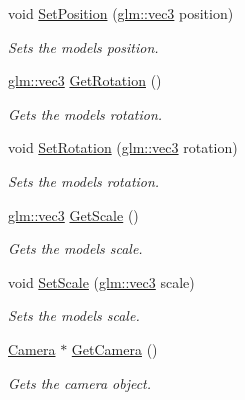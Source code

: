 \begin{CompactItemize}
void \hyperlink{class_model_3a615a604e26270bd0849462718703b2}{SetPosition} (\hyperlink{group__core__types_g1c47e8b3386109bc992b6c48e91b0be7}{glm::vec3} position)
\begin{CompactList}\small\item\em Sets the models position. \item\end{CompactList}\item 
\hyperlink{group__core__types_g1c47e8b3386109bc992b6c48e91b0be7}{glm::vec3} \hyperlink{class_model_4000e7bcd78069bc4584da37d2bf3d66}{GetRotation} ()
\begin{CompactList}\small\item\em Gets the models rotation. \item\end{CompactList}\item 
void \hyperlink{class_model_71aa61e54f3f12bc86175fa359079d23}{SetRotation} (\hyperlink{group__core__types_g1c47e8b3386109bc992b6c48e91b0be7}{glm::vec3} rotation)
\begin{CompactList}\small\item\em Sets the models rotation. \item\end{CompactList}\item 
\hyperlink{group__core__types_g1c47e8b3386109bc992b6c48e91b0be7}{glm::vec3} \hyperlink{class_model_1b61b8298674542ad929bf582b4de262}{GetScale} ()
\begin{CompactList}\small\item\em Gets the models scale. \item\end{CompactList}\item 
void \hyperlink{class_model_76860d36c983eb38250588899775aab7}{SetScale} (\hyperlink{group__core__types_g1c47e8b3386109bc992b6c48e91b0be7}{glm::vec3} scale)
\begin{CompactList}\small\item\em Sets the models scale. \item\end{CompactList}\item 
\hyperlink{class_camera}{Camera} $\ast$ \hyperlink{class_model_8c6429a35a1376657357e6e770470f13}{GetCamera} ()
\begin{CompactList}\small\item\em Gets the camera object. \item\end{CompactList}\item 

\end{CompactItemize}
